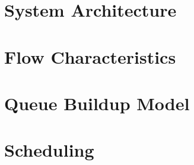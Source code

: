 \section{System Architecture}

\section{Flow Characteristics}

\section{Queue Buildup Model}

\section{Scheduling }